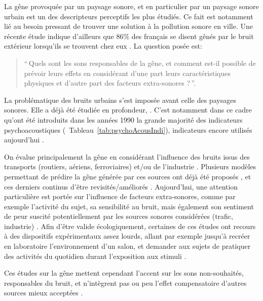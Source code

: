 La gêne provoquée par un paysage sonore, et en particulier par un paysage sonore urbain est un des descripteurs perceptifs les plus étudiés. Ce fait est notamment lié au besoin pressant de trouver une solution à la pollution sonore en ville. Une récente étude indique d'ailleurs que 86\% des français se disent gênés par le bruit extérieur lorsqu'ils se trouvent chez eux \citep{noiseFrench}. La question posée est: \\

\begin{quote}
``\,Quels sont les sons responsables de la gêne, et comment est-il possible de prévoir leurs effets en considérant d'une part leurs caractéristiques physiques et d'autre part des facteurs extra-sonores ?\,''.
\end{quote}

La problématique des bruits urbains s'est imposée avant celle des paysages sonores. Elle a déjà été étudiée en profondeur, \citep{marquis2005noisea,marquis2005noiseb}. C'est notamment dans ce cadre qu'ont été introduits dans les années 1990 la grande majorité des indicateurs psychoacoustiques \citep{zwicker2013psychoacoustics}(\cf~Tableau~\ref{tab:psychoAcousIndi}), indicateurs encore utilisés aujourd'hui \citep{hall2013exploratory,fiebig2009psychoacoustic,yang2013psychoacoustical}.


On évalue principalement la gêne en considérant l'influence des bruits issus des transports (routiers, aériens, ferroviaires) et/ou de l'industrie  \citep{gille2016noise,gille2016dose,trolle2015perception,klein2015spectral}. Plusieurs modèles permettant de prédire la gêne générée par ces sources ont déjà été proposés \citep{miedema2001annoyance,miedema2004relationship}, et ces derniers continus d'être revisités/améliorés \citep{gille2016testing}. Aujourd'hui, une attention particulière est portée sur l'influence de facteurs extra-sonores, comme par exemple l'activité du sujet, sa sensibilité au bruit, mais également son sentiment de peur suscité potentiellement par les sources sonores considérées (trafic, industrie) \citep{marquis2015simulated,morel2016noise}. Afin d'être valide écologiquement, certaines de ces études ont recours à des dispositifs expérimentaux assez lourds, allant par exemple jusqu'à recréer en laboratoire l'environnement d'un salon, et demander aux sujets de pratiquer des activités du quotidien durant l'exposition aux stimuli \citep{marquis2015simulated}.

Ces études sur la gêne mettent cependant l'accent sur les sons non-souhaités, responsables du bruit, et n'intègrent pas ou peu l'effet compensatoire d'autres sources mieux acceptées \citep{aletta2016soundscape}.

